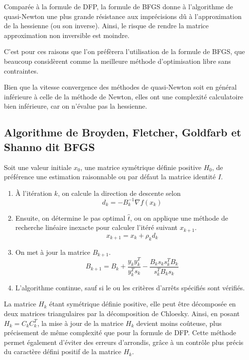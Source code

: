\documentclass[3p, twocolumn]{elsarticle}
\begin{document}
Comparée à la formule de DFP, la formule de BFGS donne à l'algorithme de quasi-Newton une plus grande résistance aux imprécisions dû à l'approximation de la hessienne (ou son inverse). Ainsi, le risque de rendre la matrice approximation non inversible est moindre.

C'est pour ces raisons que l'on préfèrera l'utilisation de la formule de BFGS, que beaucoup considèrent comme la meilleure méthode d'optimisation libre sans contraintes.

Bien que la vitesse convergence des méthodes de quasi-Newton soit en général inférieure à celle de la méthode de Newton, elles ont une complexité calculatoire bien inférieure, car on n'évalue pas la hessienne.

\subsection{Algorithme de Broyden, Fletcher, Goldfarb et Shanno dit BFGS}
Soit une valeur initiale $x_0$, une matrice symétrique définie positive $H_0$, de préférence une estimation raisonnable ou par défaut la matrice identité $I$.
\begin{enumerate}
    \item \`A l'itération $k$, on calcule la direction de descente selon
          \begin{equation*}
              d_{k}=-B_{k}^{-1}\nabla f(x_{k})
          \end{equation*}
    \item Ensuite, on détermine le pas optimal $\hat t$, ou on applique une méthode de recherche linéaire inexacte pour calculer l'itéré suivant $x_{k+1}$.
          \begin{equation*}
              x_{k+1}=x_{k}+\rho_{k}d_{k}
          \end{equation*}
    \item On met à jour la matrice $B_{k+1}$.
          \begin{equation*}
              B_{k+1} = B_k + \frac{y_ky_k^T}{y_k^Ts_k}-\frac{B_ks_ks_k^TB_k}{s_k^TB_ks_k}
          \end{equation*}
    \item L'algorithme continue, sauf si le ou les critères d'arrêts spécifiés sont vérifiés.
\end{enumerate}

La matrice $H_{k}$ étant symétrique définie positive, elle peut être décomposée en deux matrices triangulaires par la décomposition de Chloesky. Ainsi, en posant $H_{k}=C_{k}C_{k}^{T}$, la mise à jour de la matrice $H_{k}$ devient moins coûteuse, plus précisement de même complexité que pour la formule de DFP. Cette méthode permet également d'éviter des erreurs d'arrondis, grâce à un contrôle plus précis du caractère défini positif de la matrice $H_{k}$.
\end{document}
